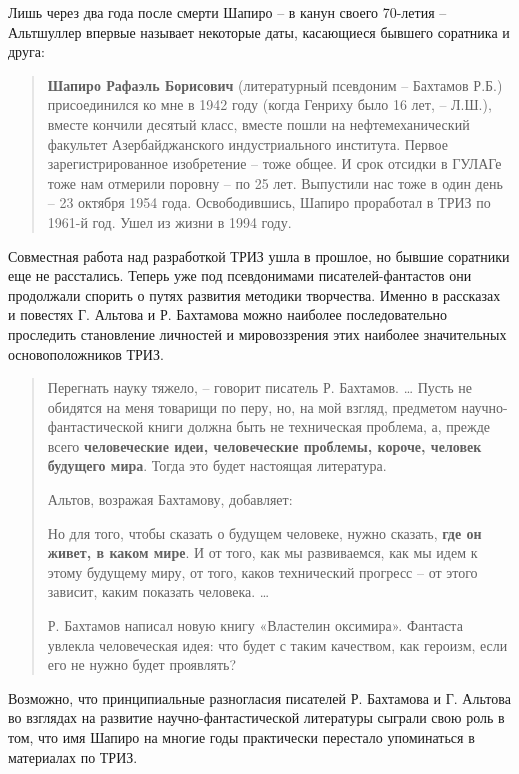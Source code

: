 \documentclass[11pt,a4paper]{article}
\begin{document}
Лишь через два года после смерти Шапиро -- в канун своего 70-летия --
Альтшуллер впервые называет некоторые даты, касающиеся бывшего соратника и
друга: 
\begin{quote}
  \textbf{Шапиро Рафаэль Борисович} (литературный псевдоним -- Бахтамов Р.Б.)
  присоединился ко мне в 1942 году (когда Генриху было 16 лет, -- Л.Ш.),
  вместе кончили десятый класс, вместе пошли на нефтемеханический факультет
  Азербайджанского индустриального института. Первое зарегистрированное
  изобретение -- тоже общее. И срок отсидки в ГУЛАГе тоже нам отмерили поровну
  -- по 25 лет. Выпустили нас тоже в один день -- 23 октября 1954 года.
  Освободившись, Шапиро проработал в ТРИЗ по 1961-й год. Ушел из жизни в 1994
  году.  \cite{Altshuller1996}
\end{quote}
Совместная работа над разработкой ТРИЗ ушла в прошлое, но бывшие соратники еще
не расстались. Теперь уже под псевдонимами писателей-фантастов они продолжали
спорить о путях развития методики творчества. Именно в рассказах и повестях
Г. Альтова и Р. Бахтамова можно наиболее последовательно проследить
становление личностей и мировоззрения этих наиболее значительных
основоположников ТРИЗ.

\begin{quote}
  Перегнать науку тяжело, -- говорит писатель Р. Бахтамов. … Пусть не обидятся
  на меня товарищи по перу, но, на мой взгляд, предметом
  научно-фантасти\-ческой книги должна быть не техническая проблема, а, прежде
  всего \textbf{человеческие идеи, человеческие проблемы, короче, человек
    будущего мира}.  Тогда это будет настоящая литература.

  Альтов, возражая Бахтамову, добавляет:

  Но для того, чтобы сказать о будущем человеке, нужно сказать, \textbf{где он
    живет, в каком мире}. И от того, как мы развиваемся, как мы идем к этому
  будущему миру, от того, каков технический прогресс -- от этого зависит,
  каким показать человека. …

  Р. Бахтамов написал новую книгу «Властелин оксимира». Фантаста увлекла
  человеческая идея: что будет с таким качеством, как героизм, если его не
  нужно будет проявлять? \cite{Amnuel964}
\end{quote}
Возможно, что принципиальные разногласия писателей Р. Бахтамова и Г. Альтова
во взглядах на развитие научно-фантастической литературы сыграли свою роль в
том, что имя Шапиро на многие годы практически перестало упоминаться в
материалах по ТРИЗ.
\end{document}
